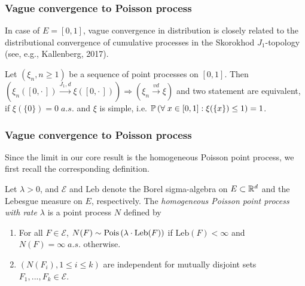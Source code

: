 \documentclass[12pt,pdf,aspectratio=169,t]{beamer}
\begin{document}
    \begin{frame}
        \frametitle{Vague convergence to Poisson process}
        In case of $E = [0, 1]$, vague convergence in distribution
        is closely related to the distributional convergence of
        cumulative processes in the Skorokhod $J_1$-topology (see, e.g., Kallenberg, 2017).
        \begin{theorem}
            Let $\left(\xi_n, n\geq 1\right)$ be a sequence of
            point processes on $[0, 1]$. Then
            $\left(
                \xi_n([0, {\cdot\,}]) \overset{J_1, d}{\longrightarrow} \xi([0, {\cdot\,}])
            \right) \Rightarrow
            \left(
                \xi_n \overset{vd}{\longrightarrow} \xi
            \right)$ and two statement are equivalent, if 
            $\xi(\{0\}) = 0 \; a.s.$ and 
            $\xi$ is simple, i.e.
            $\P{\forall \; x \in [0, 1]: \xi(\{x\}) \leq 1} = 1$.
        \end{theorem}
    \end{frame}
    \begin{frame}
        \frametitle{Vague convergence to Poisson process}
        Since the limit in our core result is the homogeneous
        Poisson point process, we first recall the corresponding definition.
        \begin{definition}
            Let $\lambda > 0$, and $\mathcal{E}$ and $\mathrm{Leb}$ denote 
            the Borel sigma-algebra on $E \subset \R^d$ and
            the Lebesgue measure on $E$, respectively.
            The \emph{homogeneous Poisson point process with rate $\lambda$} is
            a point process $N$ defined by
            \begin{enumerate}
                \item For all $F \in \mathcal{E}$,
                $N(F) \sim \Poiss{\lambda \cdot \mathrm{Leb}(F)}$ if 
                $\mathrm{Leb}(F) < \infty$ and $N(F) = \infty \; a.s.$ otherwise.
                \item $\left(N(F_i), 1\leq i \leq k\right)$ are independent 
                for mutually disjoint sets $F_1, ..., F_k \in \mathcal{E}$.
            \end{enumerate}
        \end{definition}
    \end{frame}
\end{document}
